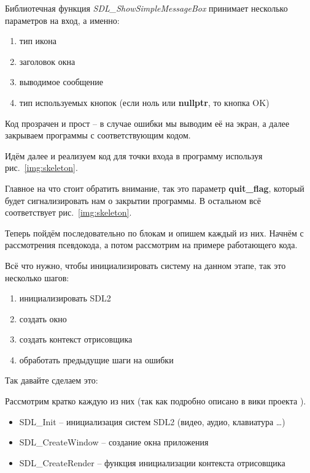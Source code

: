 

Библиотечная функция \emph{SDL\_ShowSimpleMessageBox} принимает несколько параметров на вход, а именно:
\begin{enumerate}
    \item тип икона
    \item заголовок окна
    \item выводимое сообщение
    \item тип используемых кнопок (если ноль или \textbf{nullptr}, то кнопка OK)
\end{enumerate}

Код прозрачен и прост -- в случае ошибки мы выводим её на экран, а далее закрываем программы с 
соответствующим кодом. 

Идём далее и реализуем код для точки входа в программу используя рис.~\ref{img:skeleton}.


Главное на что стоит обратить внимание, так это параметр \textbf{quit\_flag}, который будет сигнализировать 
нам о закрытии программы. В остальном всё соответствует рис.~\ref{img:skeleton}.

Теперь пойдём последовательно по блокам и опишем каждый из них. Начнём с рассмотрения псевдокода, а потом 
рассмотрим на примере работающего кода.

Всё что нужно, чтобы инициализировать систему на данном этапе, так это несколько шагов:
\begin{enumerate}
    \item инициализировать SDL2
    \item создать окно
    \item создать контекст отрисовщика
    \item обработать предыдущие шаги на ошибки
\end{enumerate}

Так давайте сделаем это:



Рассмотрим кратко каждую из них (так как подробно описано в вики проекта \cite{sdl2wiki}).

\begin{itemize}
    \item SDL\_Init -- инициализация систем SDL2 (видео, аудио, клавиатура \ldots)
    \item SDL\_CreateWindow -- создание окна приложения
    \item SDL\_CreateRender -- функция инициализации контекста отрисовщика
\end{itemize}

